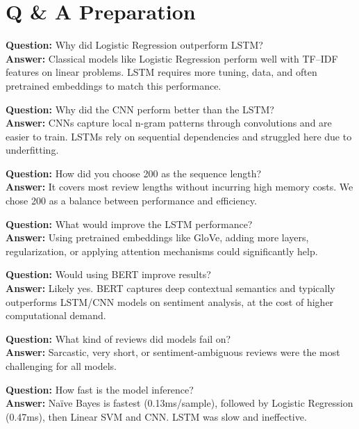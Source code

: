 \documentclass{article}
\begin{document}
\section*{Q \& A Preparation}

\noindent
\textbf{Question:} Why did Logistic Regression outperform LSTM?\\
\textbf{Answer:} Classical models like Logistic Regression perform well with TF–IDF features on linear problems. LSTM requires more tuning, data, and often pretrained embeddings to match this performance.

\vspace{1em}

\noindent
\textbf{Question:} Why did the CNN perform better than the LSTM?\\
\textbf{Answer:} CNNs capture local n-gram patterns through convolutions and are easier to train. LSTMs rely on sequential dependencies and struggled here due to underfitting.

\vspace{1em}

\noindent
\textbf{Question:} How did you choose 200 as the sequence length?\\
\textbf{Answer:} It covers most review lengths without incurring high memory costs. We chose 200 as a balance between performance and efficiency.

\vspace{1em}

\noindent
\textbf{Question:} What would improve the LSTM performance?\\
\textbf{Answer:} Using pretrained embeddings like GloVe, adding more layers, regularization, or applying attention mechanisms could significantly help.

\vspace{1em}

\noindent
\textbf{Question:} Would using BERT improve results?\\
\textbf{Answer:} Likely yes. BERT captures deep contextual semantics and typically outperforms LSTM/CNN models on sentiment analysis, at the cost of higher computational demand.

\vspace{1em}

\noindent
\textbf{Question:} What kind of reviews did models fail on?\\
\textbf{Answer:} Sarcastic, very short, or sentiment-ambiguous reviews were the most challenging for all models.

\vspace{1em}

\noindent
\textbf{Question:} How fast is the model inference?\\
\textbf{Answer:} Naïve Bayes is fastest (0.13ms/sample), followed by Logistic Regression (0.47ms), then Linear SVM and CNN. LSTM was slow and ineffective.
\end{document}

